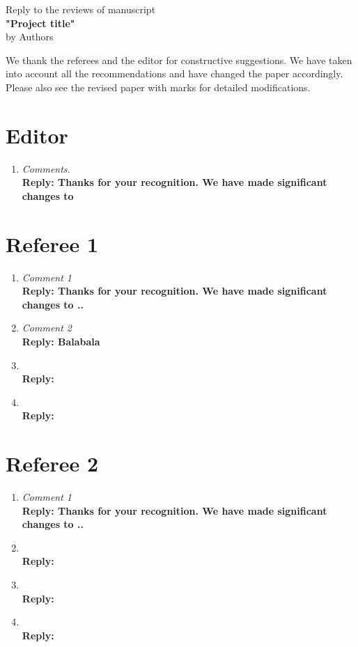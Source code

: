 \begin{center}
Reply to the reviews  of manuscript \\
\textbf{"Project title"} \\
by Authors
\end{center}

We thank the referees and the editor for constructive suggestions. We have taken into account all the recommendations and have changed the paper accordingly. Please also see the revised paper with marks for detailed modifications.

\section{Editor}
\begin{enumerate}
\item
\emph{Comments.}\\
\textbf{Reply: Thanks for your recognition.  We have made significant changes to }
\end{enumerate}


\section{Referee 1}
\begin{enumerate}
\item \emph{  Comment 1} \\
\textbf{Reply: Thanks for your recognition. We have made significant changes to ..}

\item \emph{  Comment 2} \\
\textbf{Reply: Balabala}

\item \emph{  } \\
\textbf{Reply:}

\item \emph{ } \\
\textbf{Reply: }

\end{enumerate}

\section{Referee 2}
\begin{enumerate}
\item \emph{  Comment 1} \\
\textbf{Reply: Thanks for your recognition. We have made significant changes to ..}

\item \emph{  } \\
\textbf{Reply: }

\item \emph{  } \\
\textbf{Reply:}

\item \emph{ } \\
\textbf{Reply: }

\end{enumerate}

